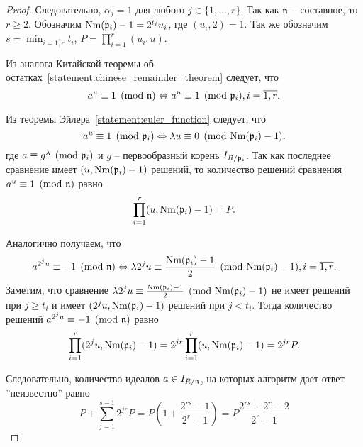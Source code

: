 \documentclass[_00_dissertation.tex]{subfiles}
\begin{document}
\begin{proof}
    Следовательно, $\alpha_j = 1$ для любого $j \in \{1, \dots, r\}$.
    Так как $\mathfrak{n}$ -- составное, то $r \ge 2$.
    Обозначим $\textrm{Nm}(\mathfrak{p}_i) - 1 = 2^{t_i} u_i$, где $(u_i, 2) = 1$.
    Так же обозначим $s = \min_{i=\overline{1, r}} t_i$, $P = \prod_{i=1}^r (u_i, u)$.

    Из аналога Китайской теоремы об остатках~\ref{statement:chinese_remainder_theorem} следует, что
    \begin{equation*}
        a^u \equiv 1 \pmod{\mathfrak{n}}
        \Leftrightarrow
        a^u \equiv 1 \pmod{\mathfrak{p}_i}, i=\overline{1, r}.
    \end{equation*}

    Из теоремы Эйлера~\ref{statement:euler_function} следует, что
    \begin{equation*}
        a^u \equiv 1 \pmod{\mathfrak{p}_i}
        \Leftrightarrow
        \lambda u \equiv 0 \pmod{\textrm{Nm}(\mathfrak{p}_i) - 1},
    \end{equation*}
    где $a \equiv g^\lambda \pmod{\mathfrak{p}_i}$ и $g$ -- первообразный корень $I_{R/\mathfrak{p}_i}$.
    Так как последнее сравнение имеет $(u, \textrm{Nm}(\mathfrak{p}_i) - 1)$ решений, то количество решений сравнения $a^u \equiv 1 \pmod{\mathfrak{n}}$ равно
    \begin{equation*}
        \prod_{i=1}^r (u, \textrm{Nm}(\mathfrak{p}_i) - 1) = P.
    \end{equation*}

    Аналогично получаем, что
    \begin{equation*}
        a^{2^j u} \equiv -1 \pmod{\mathfrak{n}}
        \Leftrightarrow
        \lambda 2^j u \equiv \frac{\textrm{Nm}(\mathfrak{p}_i) - 1}{2} \pmod{\textrm{Nm}(\mathfrak{p}_i) - 1}, i=\overline{1, r}.
    \end{equation*}
    Заметим, что сравнение $\lambda 2^j u \equiv \frac{\textrm{Nm}(\mathfrak{p}_i) - 1}{2} \pmod{\textrm{Nm}(\mathfrak{p}_i) - 1}$ не имеет решений при $j \ge t_i$ и имеет $(2^j u, \textrm{Nm}(\mathfrak{p}_i) - 1)$ решений при $j < t_i$.
    Тогда количество решений $a^{2^j u} \equiv -1 \pmod{\mathfrak{n}}$ равно
    \begin{equation*}
        \prod_{i=1}^r (2^j u, \textrm{Nm}(\mathfrak{p}_i) - 1) = 2^{jr} \prod_{i=1}^r (u, \textrm{Nm}(\mathfrak{p}_i) - 1) = 2^{jr} P.
    \end{equation*}

    Следовательно, количество идеалов $a \in I_{R/\mathfrak{n}}$, на которых алгоритм дает ответ ''неизвестно'' равно
    \begin{equation*}
        P + \sum_{j=1}^{s-1} 2^{jr} P = P\left(1 + \frac{2^{rs} - 1}{2^r - 1}\right) = P\frac{2^{rs} + 2^r - 2}{2^r - 1}
    \end{equation*}


\end{proof}
\end{document}
